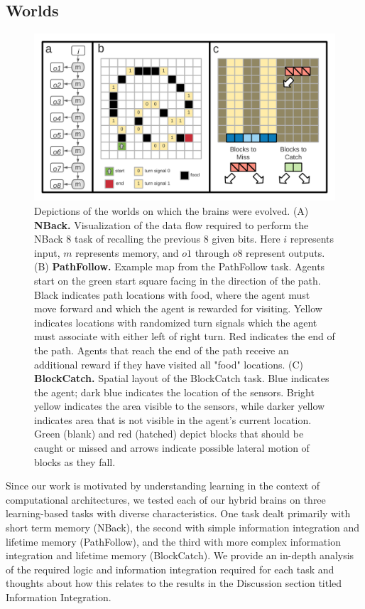 \subsection{Worlds}

\begin{figure}
    \centering
    \includegraphics[width=4.5in]{chapters/2-comp-hybrid/figs/ALIFE_2021_SI_Worlds.png}
    \caption{Depictions of the worlds on which the brains were evolved. (A) \textbf{NBack.} Visualization of the data flow required to perform the NBack 8 task of recalling the previous 8 given bits. Here $i$ represents input, $m$ represents memory, and $o1$ through $o8$ represent outputs. (B) \textbf{PathFollow.} Example map from the PathFollow task. Agents start on the green start square facing in the direction of the path. Black indicates path locations with food, where the agent must move forward and which the agent is rewarded for visiting. Yellow indicates locations with randomized turn signals which the agent must associate with either left of right turn. Red indicates the end of the path. Agents that reach the end of the path receive an additional reward if they have visited all "food" locations. (C) \textbf{BlockCatch.} Spatial layout of the BlockCatch task. Blue indicates the agent; dark blue indicates the location of the sensors. Bright yellow indicates the area visible to the sensors, while darker yellow indicates area that is not visible in the agent's current location. Green (blank) and red (hatched) depict blocks that should be caught or missed and arrows indicate possible lateral motion of blocks as they fall.}
    \label{fig:worlds}
\end{figure}

Since our work is motivated by understanding learning in the context of computational architectures, we tested each of our hybrid brains on three learning-based tasks with diverse characteristics. 
One task dealt primarily with short term memory (NBack), the second with simple information integration and lifetime memory (PathFollow), and the third with more complex information integration and lifetime memory (BlockCatch). 
We provide an in-depth analysis of the required logic and information integration required for each task and thoughts about how this relates to the results in the Discussion section titled Information Integration.

